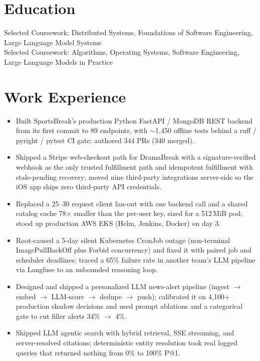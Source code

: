 \documentclass[11pt, letterpaper]{article}
\begin{document}

\section{Education}
Selected Coursework: Distributed Systems, Foundations of Software Engineering, Large Language Model Systems\\[1pt]
Selected Coursework: Algorithms, Operating Systems, Software Engineering, Large Language Models in Practice

\section{Work Experience}
\begin{itemize}
  \item Built SportsBreak's production Python FastAPI / MongoDB REST backend from its first commit to 89 endpoints, with $\sim$1{,}450 offline tests behind a ruff / pyright / pytest CI gate; authored 344 PRs (340 merged).
  \item Shipped a Stripe web-checkout path for DramaBreak with a signature-verified webhook as the only trusted fulfillment path and idempotent fulfillment with stale-pending recovery; moved nine third-party integrations server-side so the iOS app ships zero third-party API credentials.
  \item Replaced a 25--30 request client fan-out with one backend call and a shared catalog cache 78$\times$ smaller than the per-user key, sized for a 512\,MiB pod; stood up production AWS EKS (Helm, Jenkins, Docker) on day 3.
  \item Root-caused a 5-day silent Kubernetes CronJob outage (non-terminal ImagePullBackOff plus Forbid concurrency) and fixed it with paired job and scheduler deadlines; traced a 65\% failure rate in another team's LLM pipeline via Langfuse to an unbounded reasoning loop.
  \item Designed and shipped a personalized LLM news-alert pipeline (ingest $\to$ embed $\to$ LLM-score $\to$ dedupe $\to$ push); calibrated it on 4{,}100+ production shadow decisions and used prompt ablations and a categorical gate to cut filler alerts 34\% $\to$ 4\%.
  \item Shipped LLM agentic search with hybrid retrieval, SSE streaming, and server-resolved citations; deterministic entity resolution took real logged queries that returned nothing from 0\% to 100\% P@1.
\end{itemize}
\end{document}
